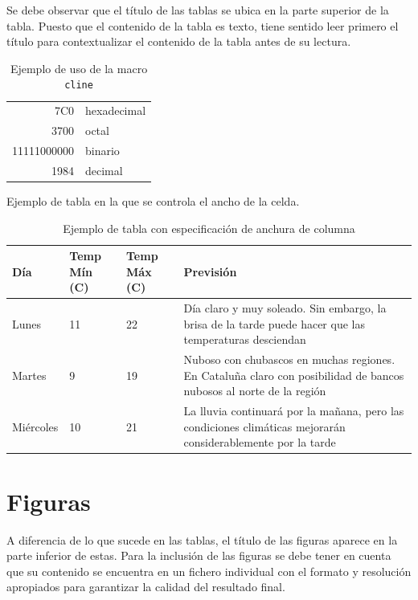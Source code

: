 Se debe observar que el título de las tablas se ubica en la parte superior de la tabla. Puesto que el contenido de la tabla es texto, tiene sentido leer primero el título para contextualizar el contenido de la tabla antes de su lectura.

\begin{table}[H]%
	\centering
	\caption{Ejemplo de uso de la macro \texttt{cline}}
	\label{tab:cline}
	\begin{tabular}[t]{|r|l|}
		\hline
		7C0 & hexadecimal \\[1cm] %
		3700 & octal \\ \cline{2-2}
		11111000000 & binario \\
		\hline \hline
		1984 & decimal \\
		\hline
	\end{tabular}
\end{table}


\noindent Ejemplo de tabla en la que se 
controla el ancho de la celda.

\begin{table}[H]%
	\centering
	\caption{Ejemplo de tabla con especificación de anchura de columna}
	\label{tab:anchura}
	\begin{tabular}{ | l | l | l | p{5cm} |}
		\hline
		Día & Temp Mín (\textdegree C) & Temp Máx (\textdegree C) & Previsión \\ \hline
		Lunes & 11 & 22 & Día claro y muy soleado. Sin embargo, la brisa de la tarde puede hacer que las temperaturas desciendan \\ \hline
		Martes & 9 & 19 & Nuboso con chubascos en muchas regiones. En Cataluña claro con posibilidad de bancos nubosos al norte de la región \\ \hline
		Miércoles & 10 & 21 & La lluvia continuará por la mañana, pero las 
		condiciones climáticas mejorarán considerablemente por la tarde\\
		\hline
	\end{tabular}
\end{table}







\section{Figuras}
A diferencia de lo que sucede en las tablas, el título de las figuras aparece en la parte inferior de estas. Para la inclusión de las figuras se debe tener en cuenta que su contenido se encuentra en un fichero individual con el formato y resolución apropiados para garantizar la calidad del resultado final.

